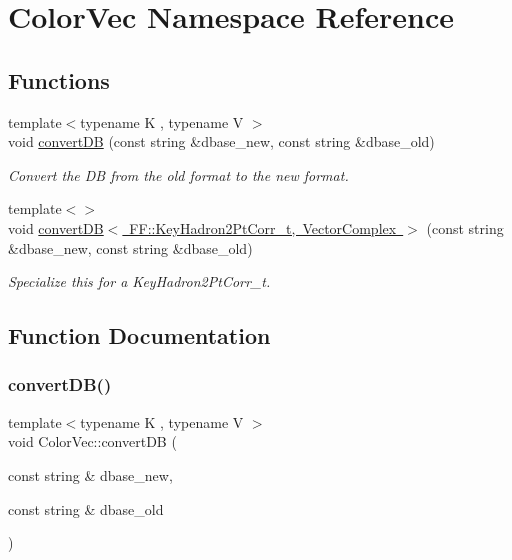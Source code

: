 \hypertarget{namespaceColorVec}{}\section{Color\+Vec Namespace Reference}
\label{namespaceColorVec}
\subsection*{Functions}
\begin{DoxyCompactItemize}
\item 
{\footnotesize template$<$typename K , typename V $>$ }\\void \mbox{\hyperlink{namespaceColorVec_a2de43a353cb0439d273dacf739397303}{convert\+DB}} (const string \&dbase\+\_\+new, const string \&dbase\+\_\+old)
\begin{DoxyCompactList}\small\item\em Convert the DB from the old format to the new format. \end{DoxyCompactList}\item 
{\footnotesize template$<$$>$ }\\void \mbox{\hyperlink{namespaceColorVec_a40c0262c4744b8e12e14737776edb8a9}{convert\+D\+B$<$ F\+F\+::\+Key\+Hadron2\+Pt\+Corr\+\_\+t, Vector\+Complex $>$}} (const string \&dbase\+\_\+new, const string \&dbase\+\_\+old)
\begin{DoxyCompactList}\small\item\em Specialize this for a Key\+Hadron2\+Pt\+Corr\+\_\+t. \end{DoxyCompactList}\end{DoxyCompactItemize}


\subsection{Function Documentation}
\mbox{\label{namespaceColorVec_a2de43a353cb0439d273dacf739397303}} 
\subsubsection{\texorpdfstring{convertDB()}{convertDB()}}
{\footnotesize\ttfamily template$<$typename K , typename V $>$ \\
void Color\+Vec\+::convert\+DB (\begin{DoxyParamCaption}\item[{const string \&}]{dbase\+\_\+new,  }\item[{const string \&}]{dbase\+\_\+old }\end{DoxyParamCaption})}



